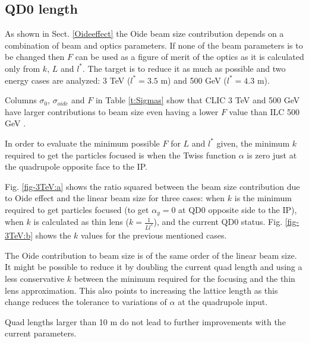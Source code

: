 \subsection{QD0 length}
As shown in Sect. \ref{Oideeffect} the Oide beam size contribution depends on a combination of beam and optics parameters. %
If none of the beam parameters is to be changed then $F$ can be used as a figure of merit of the optics as it is calculated only from $k$, $L$ and $l^*$. The target is to reduce it as much as possible and two energy cases are analyzed: 3 TeV ($l^*=3.5$ m) and 500 GeV ($l^*=4.3$ m).\par
Columns $\sigma_0$, $\sigma_{oide}$ and $F$ in Table \ref{t:Sigmas} show that CLIC 3 TeV and 500 GeV \cite{CLICdes,TomasCLIC} have larger contributions to beam size even having a lower $F$ value than ILC 500 GeV \cite{ILCdes}.\par
In order to evaluate the minimum possible $F$ for $L$ and $l^*$ given, the minimum $k$ required to get the particles focused is when the Twiss function $\alpha$ is zero just at the quadrupole opposite face to the IP.\par
Fig. \ref{fig-3TeV:a}  shows the ratio squared between the beam size contribution due to Oide effect and the linear beam size for three cases: when $k$ is the minimum required to get particles focused (to get $\alpha_y=0$ at QD0 opposite side to the IP), when $k$ is calculated as thin lens ($k=\frac{1}{Ll^*}$), and the current QD0 status. Fig. \ref{fig-3TeV:b} shows the $k$ values for the previous mentioned cases.\par
The Oide contribution to beam size is of the same order of the linear beam size. It might be possible to reduce it by doubling the current quad length and using a less conservative $k$ between the minimum required for the focusing and the thin lens approximation. This also points to increasing the lattice length as this change reduces the tolerance to variations of $\alpha$ at the quadrupole input.\par
Quad lengths larger than 10 m do not lead to further improvements with the current parameters.\par

